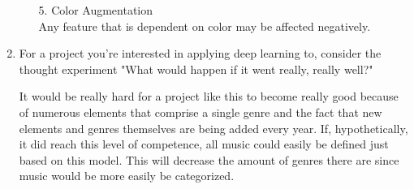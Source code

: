 \documentclass[12pt,a4paper]{article}
\begin{document}
\begin{enumerate}
\begin{itemize}
\item[5.] Color Augmentation \\
\smallbreak
Any feature that is dependent on color may be affected negatively.

\end{itemize}

\bigbreak

\item For a project you're interested in applying deep learning to, consider the thought experiment "What would happen if it went really, really well?" \\

\smallbreak

It would be really hard for a project like this to become really good because of numerous elements that comprise a single genre and the fact that new elements and genres themselves are being added every year. If, hypothetically, it did reach this level of competence, all music could easily be defined just based on this model. This will decrease the amount of genres there are since music would be more easily be categorized.
\end{enumerate}
\end{document}
